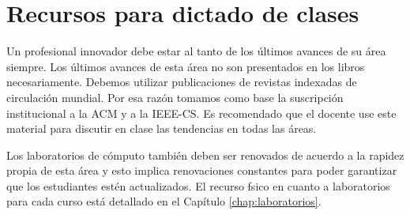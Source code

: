 \section{Recursos para dictado de clases}\label{sec:resources-to-teach}
Un profesional innovador debe estar al tanto de los últimos avances de su área siempre. Los últimos avances de esta área no son presentados en los libros necesariamente. Debemos utilizar publicaciones de revistas indexadas de circulación mundial. Por esa razón tomamos como base la suscripción institucional a la ACM y a la IEEE-CS. Es recomendado que el docente use este material para discutir en clase las tendencias en todas las áreas.

Los laboratorios de cómputo también deben ser renovados de acuerdo a la rapidez
propia de esta área y esto implica renovaciones constantes para poder garantizar
que los estudiantes estén actualizados.
El recurso f­sico en cuanto a laboratorios para cada curso está detallado en el Capítulo \ref{chap:laboratorios}.
